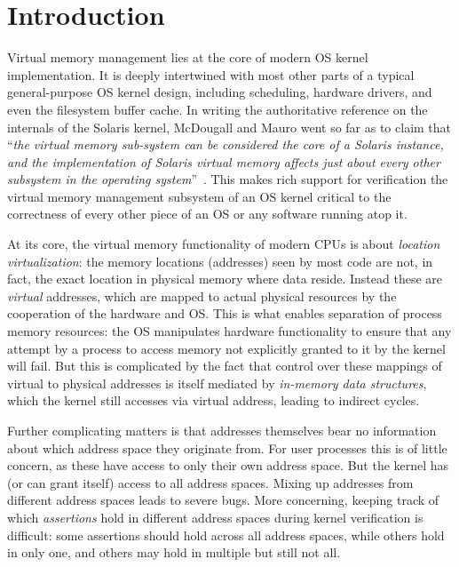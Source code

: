 \section{Introduction}
\label{sec:intro}
Virtual memory management lies at the core of modern OS kernel implementation. It is deeply intertwined with most other parts of a typical general-purpose OS kernel design, including scheduling, hardware drivers, and even the filesystem buffer cache. In writing the authoritative reference on the internals of the Solaris kernel, McDougall and Mauro went so far as to claim that ``\emph{the virtual memory sub-system can be considered the core of a Solaris instance, and the implementation of Solaris virtual memory affects just about every other subsystem in the operating system}''~\cite{mcdougall2006solaris}.
This makes rich support for verification the virtual memory management subsystem of an OS kernel critical to the correctness of every other piece of an OS or any software running atop it.

At its core, the virtual memory functionality of modern CPUs is about \emph{location virtualization}: the memory locations
(addresses) seen by most code are not, in fact, the exact location in physical memory where data reside. Instead these 
are \emph{virtual} addresses, which are mapped to actual physical resources by the cooperation of the hardware and OS. 
This is what enables separation of process memory resources:
the OS manipulates hardware functionality to ensure that any attempt by a process to access memory not explicitly granted 
to it by the kernel will fail. But this is complicated by the fact that 
control over these mappings of virtual to physical addresses is itself mediated by \emph{in-memory data structures}, 
which the kernel still accesses via virtual address, leading to indirect cycles.

Further complicating matters is that addresses themselves bear no information about which address space they originate 
from. For user processes this is of little concern, as these have access to only their own address space. But the kernel has
(or can grant itself) access to all address spaces. Mixing up addresses from different address spaces leads to severe bugs.
More concerning, keeping track of which \emph{assertions} hold in different address spaces during kernel verification is 
difficult: some assertions should hold across all address spaces, while others hold in only one, and others may hold in 
multiple but still not all.

